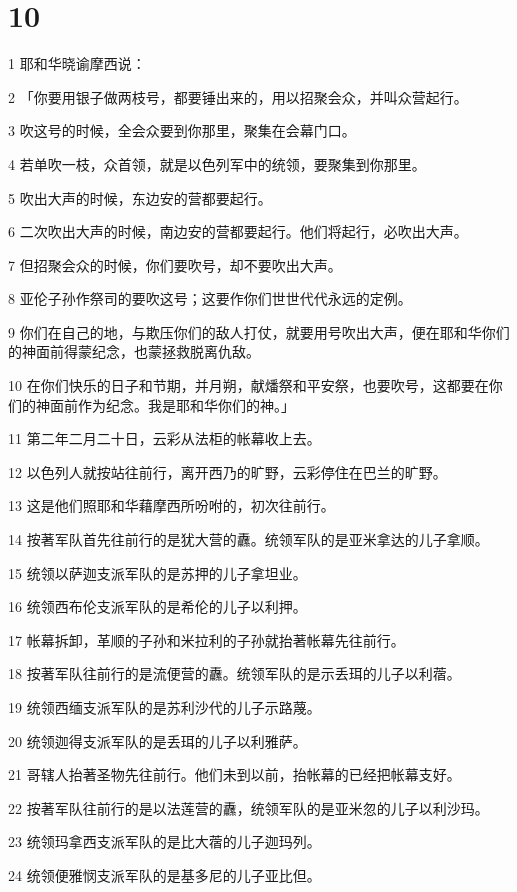 \chapter{10}

\par 1 耶和华晓谕摩西说：
\par 2 「你要用银子做两枝号，都要锤出来的，用以招聚会众，并叫众营起行。
\par 3 吹这号的时候，全会众要到你那里，聚集在会幕门口。
\par 4 若单吹一枝，众首领，就是以色列军中的统领，要聚集到你那里。
\par 5 吹出大声的时候，东边安的营都要起行。
\par 6 二次吹出大声的时候，南边安的营都要起行。他们将起行，必吹出大声。
\par 7 但招聚会众的时候，你们要吹号，却不要吹出大声。
\par 8 亚伦子孙作祭司的要吹这号；这要作你们世世代代永远的定例。
\par 9 你们在自己的地，与欺压你们的敌人打仗，就要用号吹出大声，便在耶和华你们的神面前得蒙纪念，也蒙拯救脱离仇敌。
\par 10 在你们快乐的日子和节期，并月朔，献燔祭和平安祭，也要吹号，这都要在你们的神面前作为纪念。我是耶和华你们的神。」
\par 11 第二年二月二十日，云彩从法柜的帐幕收上去。
\par 12 以色列人就按站往前行，离开西乃的旷野，云彩停住在巴兰的旷野。
\par 13 这是他们照耶和华藉摩西所吩咐的，初次往前行。
\par 14 按著军队首先往前行的是犹大营的纛。统领军队的是亚米拿达的儿子拿顺。
\par 15 统领以萨迦支派军队的是苏押的儿子拿坦业。
\par 16 统领西布伦支派军队的是希伦的儿子以利押。
\par 17 帐幕拆卸，革顺的子孙和米拉利的子孙就抬著帐幕先往前行。
\par 18 按著军队往前行的是流便营的纛。统领军队的是示丢珥的儿子以利蓿。
\par 19 统领西缅支派军队的是苏利沙代的儿子示路蔑。
\par 20 统领迦得支派军队的是丢珥的儿子以利雅萨。
\par 21 哥辖人抬著圣物先往前行。他们未到以前，抬帐幕的已经把帐幕支好。
\par 22 按著军队往前行的是以法莲营的纛，统领军队的是亚米忽的儿子以利沙玛。
\par 23 统领玛拿西支派军队的是比大蓿的儿子迦玛列。
\par 24 统领便雅悯支派军队的是基多尼的儿子亚比但。

